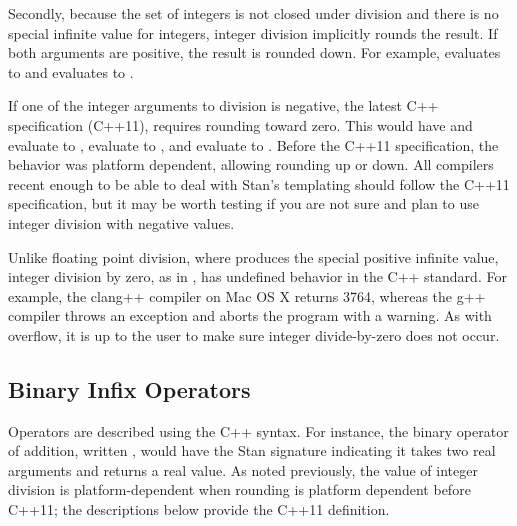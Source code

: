 Secondly, because the set of integers is not closed under division and there is no special infinite value for integers, integer division implicitly rounds the result.  If both arguments are positive, the result is rounded down.  For example,  evaluates to  and  evaluates to .

If one of the integer arguments to division is negative, the latest C++ specification (C++11), requires rounding toward zero.  This would have  and  evaluate to ,  evaluate to , and  evaluate to .  Before the C++11 specification, the behavior was platform dependent, allowing rounding up or down.  All compilers recent enough to be able to deal with Stan's templating should follow the C++11 specification, but it may be worth testing if you are not sure and plan to use integer division with negative values.

Unlike floating point division, where  produces the special positive infinite value, integer division by zero, as in , has undefined behavior in the C++ standard.  For example, the clang++ compiler on Mac OS X returns 3764, whereas the g++ compiler throws an exception and aborts the program with a warning.  As with overflow, it is up to the user to make sure integer divide-by-zero does not occur.

\subsection{Binary Infix Operators}

Operators are described using the C++ syntax.  For instance, the binary operator of addition, written , would have the Stan signature  indicating it takes two real arguments and returns a real value.  As noted previously, the value of integer division is platform-dependent when rounding is platform dependent before C++11;  the descriptions below provide the C++11 definition.

